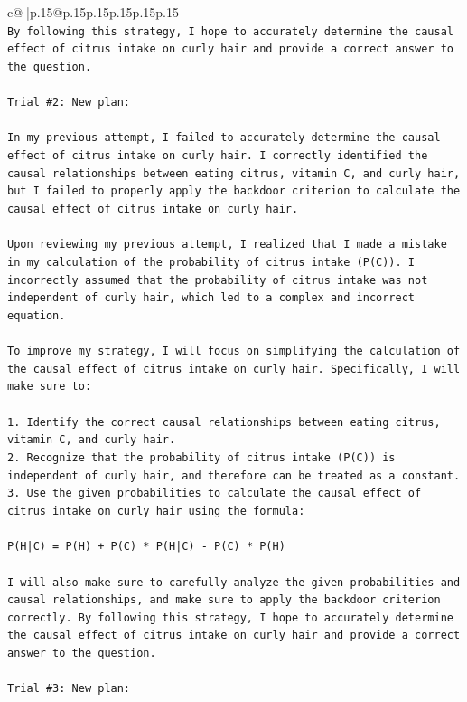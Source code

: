 \documentclass{article}
\begin{document}
{\begin{supertabular}{c@{$\;$}|p{.15\linewidth}@{}p{.15\linewidth}p{.15\linewidth}p{.15\linewidth}p{.15\linewidth}p{.15\linewidth}}
{{{\\ 
\texttt{By following this strategy, I hope to accurately determine the causal effect of citrus intake on curly hair and provide a correct answer to the question.} \\
\\ 
\texttt{Trial \#2: New plan: } \\
\\ 
\texttt{In my previous attempt, I failed to accurately determine the causal effect of citrus intake on curly hair. I correctly identified the causal relationships between eating citrus, vitamin C, and curly hair, but I failed to properly apply the backdoor criterion to calculate the causal effect of citrus intake on curly hair.} \\
\\ 
\texttt{Upon reviewing my previous attempt, I realized that I made a mistake in my calculation of the probability of citrus intake (P(C)). I incorrectly assumed that the probability of citrus intake was not independent of curly hair, which led to a complex and incorrect equation.} \\
\\ 
\texttt{To improve my strategy, I will focus on simplifying the calculation of the causal effect of citrus intake on curly hair. Specifically, I will make sure to:} \\
\\ 
\texttt{1. Identify the correct causal relationships between eating citrus, vitamin C, and curly hair.} \\
\texttt{2. Recognize that the probability of citrus intake (P(C)) is independent of curly hair, and therefore can be treated as a constant.} \\
\texttt{3. Use the given probabilities to calculate the causal effect of citrus intake on curly hair using the formula:} \\
\\ 
\texttt{P(H|C) = P(H) + P(C) * P(H|C) {-} P(C) * P(H)} \\
\\ 
\texttt{I will also make sure to carefully analyze the given probabilities and causal relationships, and make sure to apply the backdoor criterion correctly. By following this strategy, I hope to accurately determine the causal effect of citrus intake on curly hair and provide a correct answer to the question.} \\
\\ 
\texttt{Trial \#3: New plan: } \\
}}}
\end{supertabular}}
\end{document}
